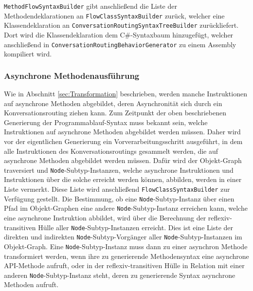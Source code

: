 \newline
\texttt{Meth\-od\-Flow\-Syn\-tax\-Buil\-der} gibt anschließend die Liste der Methodendeklarationen an \texttt{Flow\-Class\-Syn\-tax\-Buil\-der} zurück, welcher eine Klassendeklaration an \texttt{Con\-ver\-sa\-tion\-Rou\-ting\-Syn\-tax\-Tree\-Buil\-der} zurückliefert. Dort wird die Klassendeklaration dem C\#-Syntaxbaum hinzugefügt, welcher anschließend in  \texttt{Con\-ver\-sa\-tion\-Rou\-ting\-Be\-ha\-vior\-Gen\-era\-tor} zu einem Assembly kompiliert wird.

\subsubsection{Asynchrone Methodenausführung}
\label{subsubsec:Nebenlaeufigkeit}
Wie in Abschnitt \ref{sec:Transformation} beschrieben, werden manche Instruktionen auf asynchrone Methoden abgebildet, deren Asynchronität sich durch ein Konversationsrouting ziehen kann. Zum Zeitpunkt der oben beschriebenen Generierung der Pro\-gramm\-ab\-lauf-Syntax muss bekannt sein, welche Instruktionen auf asynchrone Methoden abgebildet werden müssen. Daher wird vor der eigentlichen Generierung ein Vorverarbeitungsschritt ausgeführt, in dem alle Instruktionen des Konversationsroutings gesammelt werden, die auf asynchrone Methoden abgebildet werden müssen. Dafür wird der Objekt-Graph traversiert und \texttt{Node}-Subtyp-Instanzen, welche asynchrone Instruktionen und Instruktionen über die solche erreicht werden können, abbilden, werden in einer Liste vermerkt. Diese Liste wird anschließend \texttt{FlowClassSyntaxBuilder} zur Verfügung gestellt. Die Bestimmung, ob eine \texttt{Node}-Subtyp-Instanz über einen Pfad im Objekt-Graphen eine andere \texttt{Node}-Subtyp-Instanz erreichen kann, welche eine asynchrone Instruktion abbildet, wird über die Berechnung der reflexiv-transitiven Hülle aller \texttt{Node}-Subtyp-Instanzen erreicht. Dies ist eine Liste der direkten und indirekten \texttt{Node}-Subtyp-Vorgänger aller \texttt{Node}-Subtyp-Instanzen im Objekt-Graph. Eine \texttt{Node}-Subtyp-Instanz muss dann zu einer asynchron Methode transformiert werden, wenn ihre zu generierende Methodensyntax eine asynchrone API-Methode aufruft, oder in der reflexiv-transitiven Hülle in Relation mit einer anderen \texttt{Node}-Subtyp-Instanz steht, deren zu generierende Syntax asynchrone Methoden aufruft.

